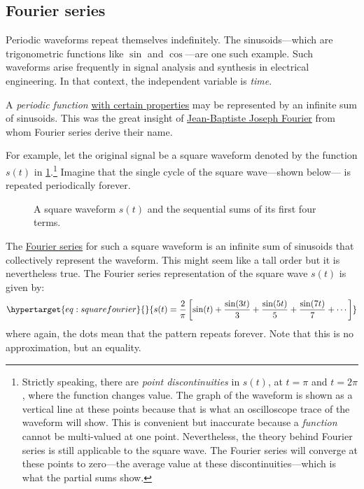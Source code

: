 \documentclass[
  a4paper,
]{article}
\begin{document}
\hypertarget{fourier-series}{%
\subsection{Fourier series}\label{fourier-series}}

Periodic waveforms repeat themselves indefinitely. The sinusoids---which
are trigonometric functions like \(\sin\) and \(\cos\)---are one such
example. Such waveforms arise frequently in signal analysis and
synthesis in electrical engineering. In that context, the independent
variable is \emph{time}.

A \emph{periodic function}
\href{https://eng.libretexts.org/Bookshelves/Electrical_Engineering/Signal_Processing_and_Modeling/Signals_and_Systems_(Baraniuk_et_al.)/06\%3A_Continuous_Time_Fourier_Series_(CTFS)/6.06\%3A_Convergence_of_Fourier_Series}{with
certain properties} may be represented by an infinite sum of sinusoids.
This was the great insight of
\href{https://en.wikipedia.org/wiki/Joseph_Fourier}{Jean-Baptiste Joseph
Fourier} from whom Fourier series derive their name.

For example, let the original signal be a square waveform denoted by the
function \(s(t)\) in \cref{fig:squarefourier}.\footnote{Strictly
  speaking, there are \emph{point discontinuities} in \(s(t)\), at
  \(t=\pi\) and \(t = 2\pi\), where the function changes value. The
  graph of the waveform is shown as a vertical line at these points
  because that is what an oscilloscope trace of the waveform will show.
  This is convenient but inaccurate because a \emph{function} cannot be
  multi-valued at one point. Nevertheless, the theory behind Fourier
  series is still applicable to the square wave. The Fourier series will
  converge at these points to zero---the average value at these
  discontinuities---which is what the partial sums show.} Imagine that
the single cycle of the square wave---shown below--- is repeated
periodically forever.

\begin{figure}
\hypertarget{fig:squarefourier}{%
\centering

\caption{A square waveform \(s(t)\) and the sequential sums of its first
four terms.}\label{fig:squarefourier}
}
\end{figure}

The \href{https://mathworld.wolfram.com/FourierSeries.html}{Fourier
series} for such a square waveform is an infinite sum of sinusoids that
collectively represent the waveform. This might seem like a tall order
but it is nevertheless true. The Fourier series representation of the
square wave \(s(t)\) is given by:
\begin{equation}\protect\hypertarget{eq:squarefourier}{}{
s(t) = \frac{2}{\pi}\left[\sin(t) + \frac{\sin(3t)}{3} + \frac{\sin(5t)}{5} +  \frac{\sin(7t)} {7} + \cdots\right]
}\label{eq:squarefourier}\end{equation} where again, the dots mean that
the pattern repeats forever. Note that this is no approximation, but an
equality.
\end{document}
